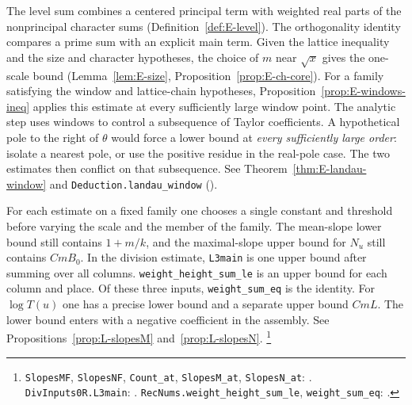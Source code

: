 \begin{description}[leftmargin=0pt,style=nextline]
\item[E. From windows to a zero-free half-plane.]
The level sum combines a centered principal term with weighted real parts of the nonprincipal
character sums (Definition~\ref{def:E-level}). The orthogonality identity compares a prime sum
with an explicit main term. Given the lattice inequality and the size and character hypotheses,
the choice of $m$ near $\sqrt{x}$ gives the one-scale bound
(Lemma~\ref{lem:E-size}, Proposition~\ref{prop:E-ch-core}). For a family satisfying the window and lattice-chain hypotheses, Proposition~\ref{prop:E-windows-ineq} applies this estimate at every sufficiently large window point.
The analytic step uses windows to control a subsequence of Taylor coefficients. A hypothetical
pole to the right of $\theta$ would force a lower bound at \emph{every sufficiently large order}:
isolate a nearest pole, or use the positive residue in the real-pole case. The two estimates
then conflict on that subsequence. See Theorem~\ref{thm:E-landau-window} and
\texttt{Deduction.landau\_window} ().

\item[L. What is uniform in the end-slope estimates?]
For each estimate on a fixed family one chooses a single constant and threshold before varying the scale and the
member of the family. The mean-slope lower bound still contains $1+m/k$, and the maximal-slope
upper bound for $N_u$ still contains $CmB_0$. In the division estimate,
\texttt{L3main} is one upper bound after summing over all columns.
\texttt{weight\_height\_sum\_le} is an upper bound for each column and place.
Of these three inputs, \texttt{weight\_sum\_eq} is the identity.
For $\log T(u)$ one has a precise lower bound and a separate upper bound $CmL$.
The lower bound enters with a negative coefficient in the assembly. See
Propositions~\ref{prop:L-slopesM} and~\ref{prop:L-slopesN}.
\footnote{\texttt{SlopesMF}, \texttt{SlopesNF}, \texttt{Count\_at}, \texttt{SlopesM\_at},
\texttt{SlopesN\_at}: .
\texttt{DivInputs0R.L3main}: .
\texttt{RecNums.weight\_height\_sum\_le}, \texttt{weight\_sum\_eq}:
.}


\end{description}
